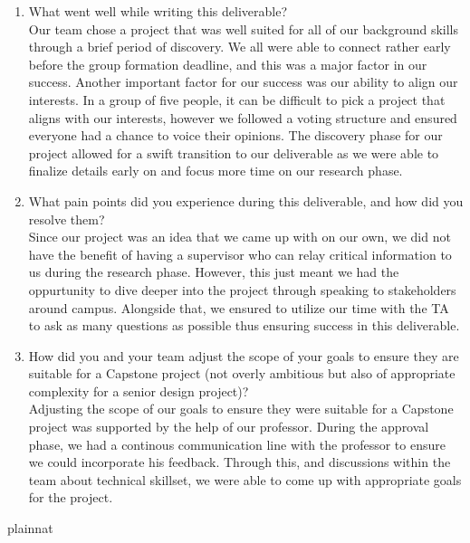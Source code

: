 \documentclass{article}
\begin{document}


\begin{enumerate}
    \item What went well while writing this deliverable? \\
    Our team chose a project that was well suited for all of our background skills 
    through a brief period of discovery. We all were able to connect rather early before
    the group formation deadline, and this was a major factor in our success. Another important
    factor for our success was our ability to align our interests. In a group of five people, it
    can be difficult to pick a project that aligns with our interests, however we followed a voting 
    structure and ensured everyone had a chance to voice their opinions. The discovery phase for our 
    project allowed for a swift transition to our deliverable as we were able to finalize details early 
    on and focus more time on our research phase.
    \item What pain points did you experience during this deliverable, and how
    did you resolve them?\\
    Since our project was an idea that we came up with on our own, we did not have the benefit of having a supervisor 
    who can relay critical information to us during the research phase. However, this just meant we had the oppurtunity
    to dive deeper into the project through speaking to stakeholders around campus. Alongside that, we ensured to utilize our time 
    with the TA to ask as many questions as possible thus ensuring success in this deliverable.
    \item How did you and your team adjust the scope of your goals to ensure
    they are suitable for a Capstone project (not overly ambitious but also of
    appropriate complexity for a senior design project)?\\
    Adjusting the scope of our goals to ensure they were suitable for a Capstone project was supported by the help of our professor. During 
    the approval phase, we had a continous communication line with the professor to ensure we could incorporate his feedback. Through this, 
    and discussions within the team about technical skillset, we were able to come up with appropriate goals for the project.
    
\end{enumerate}  

 {plainnat}

\end{document}
